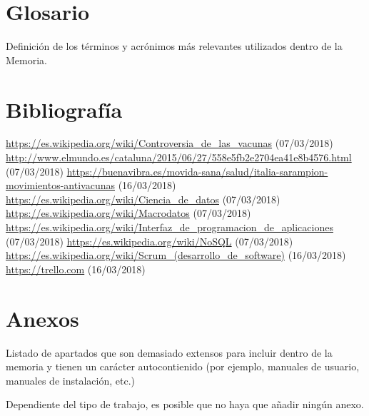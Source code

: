 \documentclass[11pt,a4paper]{article}
\begin{document}
\section{Glosario}
Definición de los términos y acrónimos más relevantes utilizados dentro de la Memoria. 
\newpage 


\section{Bibliografía}
\begin{thebibliography}{0}
   \url{https://es.wikipedia.org/wiki/Controversia_de_las_vacunas} (07/03/2018)
   \url{http://www.elmundo.es/cataluna/2015/06/27/558e5fb2e2704ea41e8b4576.html} (07/03/2018)
   \url{https://buenavibra.es/movida-sana/salud/italia-sarampion-movimientos-antivacunas} (16/03/2018)
   \url{https://es.wikipedia.org/wiki/Ciencia_de_datos} (07/03/2018)
   \url{https://es.wikipedia.org/wiki/Macrodatos} (07/03/2018)
   \url{https://es.wikipedia.org/wiki/Interfaz_de_programacion_de_aplicaciones} (07/03/2018)
   \url{https://es.wikipedia.org/wiki/NoSQL} (07/03/2018)
   \url{https://es.wikipedia.org/wiki/Scrum_(desarrollo_de_software)} (16/03/2018)
   \url{https://trello.com} (16/03/2018)
\end{thebibliography}
\newpage 


\section{Anexos}
Listado de apartados que son demasiado extensos para incluir dentro de la memoria y tienen un carácter autocontienido (por ejemplo, manuales de usuario, manuales de instalación, etc.) 

Dependiente del tipo de trabajo, es posible que no haya que añadir ningún anexo.
\end{document}
